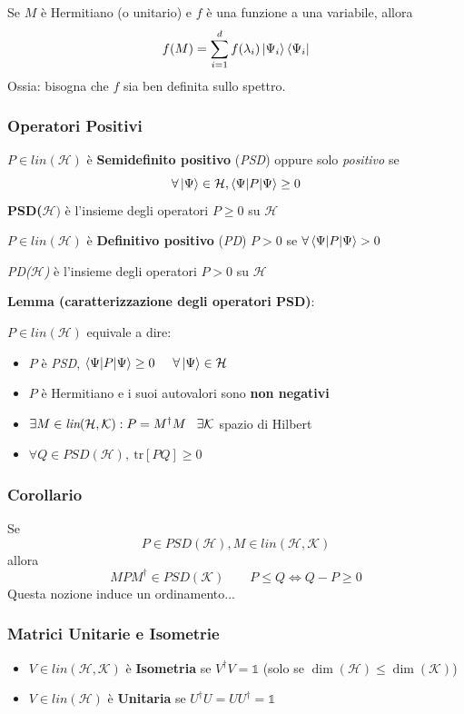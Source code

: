 \documentclass{report}
\begin{document}
\medskip
Se $M$ è Hermitiano  (o unitario) e $f$ è una funzione a una variabile, allora
$$f(M) = \sum^d_{i=1} f(\lambda_i)\ket{\Psi_i} \bra{\Psi_i}$$
Ossia: bisogna che $f$ sia ben definita sullo spettro.

\subsubsection{Operatori Positivi}
$P \in \textit{lin}(\mathcal{H})$ è \textbf{Semidefinito positivo} (\textit{PSD}) oppure solo \textit{positivo} se
$$\forall \ket{\Psi} \in \mathcal{H}, \braket{\Psi|P|\Psi} \ge 0$$
\textbf{PSD($\mathcal{H})$} è l'insieme degli operatori $P\ge 0$ su $\mathcal{H}$
\medskip

$P \in \textit{lin}(\mathcal{H})$ è \textbf{Definitivo positivo} (\textit{PD}) $P > 0$ se $\forall \braket{\Psi|P| \Psi} > 0$

\medskip
\textit{PD($\mathcal{H}$)} è l'insieme degli operatori $P > 0$ su $\mathcal{H}$

\medskip 
\textbf{Lemma (caratterizzazione degli operatori PSD)}:

$P \in \textit{lin}(\mathcal{H})$ equivale a dire:
\begin{itemize}
    \item[\textbf{A.}] $P$ è \textit{PSD}, $\braket{\Psi|P|\Psi} \ge 0 \hspace{0.5cm} \forall\ket{\Psi}\in\mathcal{H}$ 
    \item[\textbf{B.}] $P$ è Hermitiano e i suoi autovalori sono \textbf{non negativi}
    \item[\textbf{C.}] $\exists M \in \textit{lin}(\mathcal{H,K}):P=M^\dagger M \hspace{0.3cm} \exists \mathcal{K}$ spazio di Hilbert
    \item[\textbf{D.}] $\forall Q \in PSD(\mathcal{H}),\  \text{tr}[PQ] \ge 0$
\end{itemize}

\subsubsection{Corollario}
Se $$P \in PSD(\mathcal{H}), M \in \textit{lin}(\mathcal{H,K})$$ allora $$MPM^\dagger \in PSD(\mathcal{K}) \qquad P\le Q \Leftrightarrow Q-P \ge 0$$
Questa nozione induce un ordinamento...

\subsubsection{Matrici Unitarie e Isometrie}
\begin{itemize}
	\item $V \in \textit{lin}(\mathcal{H,K})$ è \textbf{Isometria} se $V^\dagger V = \mathbb{1}$ (solo se $\dim(\mathcal{H}) \le\dim(\mathcal{K})$)
	
	\item $V\in \textit{lin}(\mathcal{H})$ è \textbf{Unitaria} se $U^\dagger U = UU^\dagger = \mathbb{1}$
	
\end{itemize}
\end{document}
